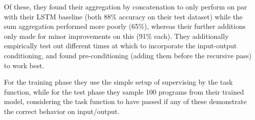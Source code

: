 \documentclass{article}
\begin{document}
Of these, they found their aggregation by concatenation to only perform on par with their LSTM baseline (both 88\% accuracy on their test dataset) while the sum aggregation performed more poorly (65\%),
whereas their further additions only made for minor improvements on this (91\% each).
They additionally empirically test out different times at which to incorporate the input-output conditioning,
and found pre-conditioning (adding them before the recursive pass) to work best.

For the training phase they use the simple setup of supervising by the task function,
while for the test phase they sample 100 programs from their trained model,
considering the task function to have passed if any of these demonstrate the correct behavior on input/output.
\end{document}
